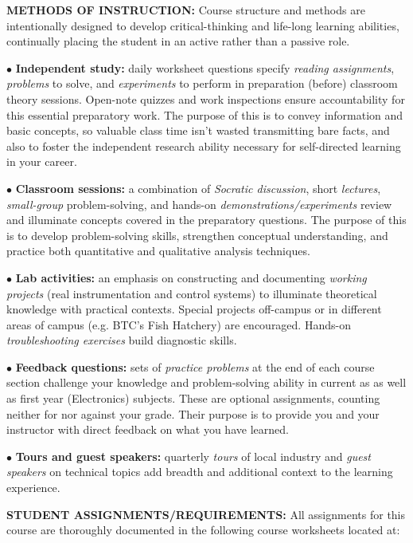 \vskip 10pt

\noindent
{\bf METHODS OF INSTRUCTION:} Course structure and methods are intentionally designed to develop critical-thinking and life-long learning abilities, continually placing the student in an active rather than a passive role.  

\item{$\bullet$} {\bf Independent study:} daily worksheet questions specify {\it reading assignments}, {\it problems} to solve, and {\it experiments} to perform in preparation (before) classroom theory sessions.  Open-note quizzes and work inspections ensure accountability for this essential preparatory work.  The purpose of this is to convey information and basic concepts, so valuable class time isn't wasted transmitting bare facts, and also to foster the independent research ability necessary for self-directed learning in your career.
\item{$\bullet$} {\bf Classroom sessions:} a combination of {\it Socratic discussion}, short {\it lectures}, {\it small-group} problem-solving, and hands-on {\it demonstrations/experiments} review and illuminate concepts covered in the preparatory questions.  The purpose of this is to develop problem-solving skills, strengthen conceptual understanding, and practice both quantitative and qualitative analysis techniques.
\item{$\bullet$} {\bf Lab activities:} an emphasis on constructing and documenting {\it working projects} (real instrumentation and control systems) to illuminate theoretical knowledge with practical contexts.  Special projects off-campus or in different areas of campus (e.g. BTC's Fish Hatchery) are encouraged.  Hands-on {\it troubleshooting exercises} build diagnostic skills.
\item{$\bullet$} {\bf Feedback questions:} sets of {\it practice problems} at the end of each course section challenge your knowledge and problem-solving ability in current as as well as first year (Electronics) subjects.  These are optional assignments, counting neither for nor against your grade.  Their purpose is to provide you and your instructor with direct feedback on what you have learned.
\item{$\bullet$} {\bf Tours and guest speakers:} quarterly {\it tours} of local industry and {\it guest speakers} on technical topics add breadth and additional context to the learning experience.

\vskip 10pt

\noindent
{\bf STUDENT ASSIGNMENTS/REQUIREMENTS:} All assignments for this course are thoroughly documented in the following course worksheets located at:


